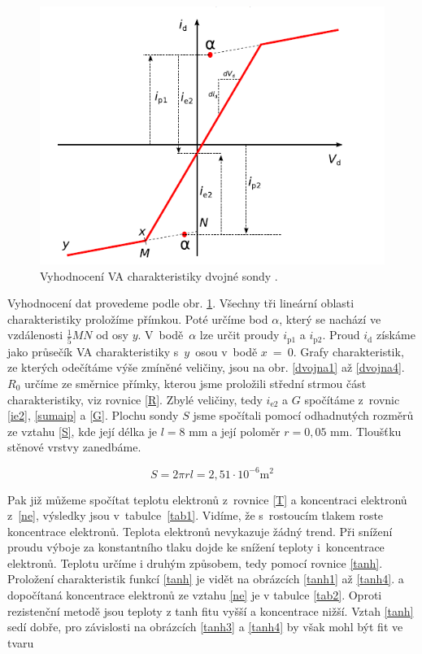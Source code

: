 \documentclass[a4paper,12pt]{article}
\begin{document}
\begin{figure}[h]
	\centering
	\includegraphics[width=130mm]{VAmerenidvojna.png}
	\caption{Vyhodnocení VA charakteristiky dvojné sondy \cite{navod}.}
	\label{VAmerenidvojna}
\end{figure}
Vyhodnocení dat provedeme podle obr. \ref{VAmerenidvojna}.
Všechny tři lineární oblasti charakteristiky proložíme přímkou.
Poté určíme bod $\alpha$, který se nachází ve vzdálenosti
$\frac{1}{5}MN$ od osy $y$. V~bodě~$\alpha$ lze určit proudy
$i_\text{{p1}}$ a $i_\text{{p2}}$. Proud $i_\text{{d}}$
získáme jako průsečík VA charakteristiky s~$y$~osou v~bodě
$x$~=~0. Grafy charakteristik, ze kterých odečítáme výše
zmíněné veličiny, jsou na obr. \ref{dvojna1} až \ref{dvojna4}.
$R_0$ určíme ze směrnice přímky, kterou jsme proložili
střední strmou část charakteristiky, viz rovnice \eqref{R}.
Zbylé veličiny, tedy $i_\text{{e2}}$ a $G$ spočítáme z~rovnic
\eqref{ie2}, \eqref{sumaip} a \eqref{G}. Plochu sondy $S$
jsme spočítali pomocí odhadnutých rozměrů ze vztahu \eqref{S},
kde její délka je $l = 8$ \si{\milli\meter} a její poloměr
$r = 0,05$ \si{\milli\meter}. Tloušťku stěnové
vrstvy zanedbáme.

\begin{equation}
	S = 2 \pi r l = 2,51\cdot 10^{-6} \si{\meter\squared}
	\label{S}
\end{equation}

Pak již můžeme
spočítat teplotu elektronů z~rovnice \eqref{T} a koncentraci
elektronů z~\eqref{ne}, výsledky jsou v~tabulce~\ref{tab1}.
Vidíme, že s~rostoucím tlakem roste koncentrace elektronů.
Teplota elektronů nevykazuje žádný trend. Při snížení proudu
výboje za konstantního tlaku dojde ke snížení teploty i~koncentrace
elektronů.
\newpage
Teplotu určíme i druhým způsobem, tedy pomocí rovnice
\eqref{tanh}. Proložení charakteristik funkcí \eqref{tanh}
je vidět na obrázcích \ref{tanh1} až \ref{tanh4}.
a dopočítaná koncentrace elektronů ze vztahu \eqref{ne}
je v tabulce \ref{tab2}. Oproti rezistenční metodě jsou
teploty z tanh fitu vyšší a koncentrace nižší. Vztah
\eqref{tanh} sedí dobře, pro závislosti na obrázcích
\ref{tanh3} a \ref{tanh4}
by však mohl být fit ve tvaru
\end{document}
